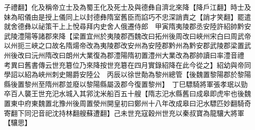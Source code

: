 子禮翻】化及稱帝立士及為蜀王化及死士及與德彝自濟北來降【降戶江翻】時士及妹為昭儀由是授上儀同上以封德彝隋室舊臣而諂巧不忠深誚責之【誚才笑翻】罷遣就舍德彝以祕策干上上悅尋拜内史舍人俄遷侍郎　甲寅隋夷陵郡丞安陸許紹帥黔安武陵澧陽等諸郡來降【梁置宜州於夷陵郡西魏改曰拓州後周改曰峽州宋白曰周武帝以州扼三峽之口故名隋煬帝改為夷陵郡改安州為安陸郡黔州為黔安郡武陵郡梁置武州後改曰沅州隋改曰朗州大業復為郡澧陽隋初置澧州大業改為郡帥讀曰率澧音禮　考異曰舊書傳云世充簒位乃來降按世充簒在四月實錄紹降在此今從之】紹幼與帝同學詔以紹為峽州刺史賜爵安陸公　丙辰以徐世勣為黎州總管【後魏置黎陽郡於黎陽縣後置黎州至隋州郡並廢以黎陽縣屬汲郡今復置黎州】　丁巳驃騎將軍張孝珉以勁卒百人襲王世充汜水城入其郛沈米船百五十艘【隋志汜水縣舊曰成皋即虎牢也後魏置東中府東魏置北豫州後周置滎州開皇初曰鄭州十八年改成皋曰汜水驃匹妙翻騎奇寄翻下同汜音祀沈持林翻艘蘇遭翻】己未世充寇穀州世充以秦叔寶為龍驤大將軍【驤思】

